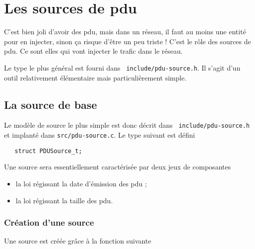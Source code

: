 %
\section{Les sources de {\sc pdu}}
\label{section:pdu-source}

   C'est bien joli d'avoir des {\sc pdu}, mais dans un réseau, il faut
au moins une entité pour en injecter, sinon ça risque d'être un peu
triste ! C'est le rôle des sources de {\sc pdu}. Ce sont elles qui
vont injecter le trafic dans le réseau.

   Le type le plus général est fourni dans {\tt
include/pdu-source.h}. Il s'agit d'un outil relativement élémentaire
   mais particulièrement simple.

%
\subsection{La source de base}

   Le modèle de source le plus simple est donc décrit dans {\tt
include/pdu-source.h} et implanté dans {\tt src/pdu-source.c}. Le type
   suivant est défini 

\begin{verbatim}
   struct PDUSource_t;
\end{verbatim}

   Une source sera essentiellement caractérisée par deux jeux de
composantes 

\begin{itemize}
   \item la loi régissant la date d'émission des {\sc pdu} ;
   \item la loi régissant la taille des {\sc pdu}.
\end{itemize}

%
\subsubsection{Création d'une source}

   Une source est créée grâce à la fonction suivante

